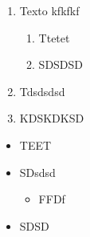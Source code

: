 \documentclass[a4paper, 12pt]{article}
\begin{document}
\begin{enumerate}
	\item Texto kfkfkf
		\begin{enumerate}
			\item Ttetet
			\item SDSDSD
		\end{enumerate}
	\item Tdsdsdsd
	\item   KDSKDKSD
\end{enumerate}
\begin{itemize}
	\item TEET
	\item  SDsdsd
	\begin{itemize}
		\item FFDf
	\end{itemize}
	\item   SDSD
\end{itemize}
\end{document}
